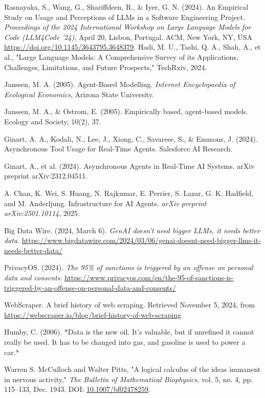 \documentclass[english,master]{unibg}
\begin{document}
\begin{thebibliography}{1}
Rasnayaka, S., Wang, G., Shariffdeen, R., \& Iyer, G. N. (2024). An Empirical Study on Usage and Perceptions of LLMs in a Software Engineering Project. \textit{Proceedings of the 2024 International Workshop on Large Language Models for Code (LLM4Code ’24)}, April 20, Lisbon, Portugal. ACM, New York, NY, USA \url{https://doi.org/10.1145/3643795.3648379}.
 Hadi, M. U., Tashi, Q. A., Shah, A., et al., "Large Language Models: A Comprehensive Survey of its Applications, Challenges, Limitations, and Future Prospects," TechRxiv, 2024.

 Janssen, M. A. (2005). Agent-Based Modelling. \textit{Internet Encyclopaedia of Ecological Economics}, Arizona State University.

 Janssen, M. A., \& Ostrom, E. (2005). Empirically based, agent-based models. Ecology and Society, 10(2), 37.



 Ginart, A. A., Kodali, N., Lee, J., Xiong, C., Savarese, S., \& Emmons, J. (2024). Asynchronous Tool Usage for Real-Time Agents. Salesforce AI Research.



 Ginart, A., et al. (2024). Asynchronous Agents in Real-Time AI Systems. arXiv preprint arXiv:2312.04511.

A. Chan, K. Wei, S. Huang, N. Rajkumar, E. Perrier, S. Lazar, G. K. Hadfield, and M. Anderljung.
\newblock Infrastructure for AI Agents.
\newblock \emph{arXiv preprint arXiv:2501.10114}, 2025.

Big Data Wire. (2024, March 6). \textit{GenAI doesn’t need bigger LLMs, it needs better data}. \url{https://www.bigdatawire.com/2024/03/06/genai-doesnt-need-bigger-llms-it-needs-better-data/}

PrivacyOS. (2024). \textit{The 95\% of sanctions is triggered by an offense on personal data and consents}. \url{https://www.privacyos.com/en/the-95-of-sanctions-is-triggered-by-an-offense-on-personal-data-and-consents/}

WebScraper. A brief history of web scraping. Retrieved November 5, 2024, from \url{https://webscraper.io/blog/brief-history-of-web-scraping}

Humby, C. (2006). *Data is the new oil. It's valuable, but if unrefined it cannot really be used. It has to be changed into gas, and gasoline is used to power a car.*

Warren S. McCulloch and Walter Pitts, 
"A logical calculus of the ideas immanent in nervous activity," 
\textit{The Bulletin of Mathematical Biophysics}, 
vol. 5, no. 4, pp. 115--133, Dec. 1943. 
DOI: \href{https://doi.org/10.1007/bf02478259}{10.1007/bf02478259}.


\end{thebibliography}
\end{document}
